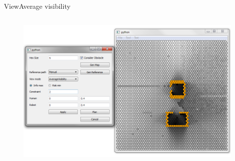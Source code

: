 \begin{frame}{View}{Average visibility}

\begin{columns}
\begin{figure}
\centering
\includegraphics[width = \textwidth]{./screenshot/average_visibility_view.png}
\end{figure}

\begin{minipage}{\textwidth}
\end{minipage}
\end{columns}

\end{frame}

